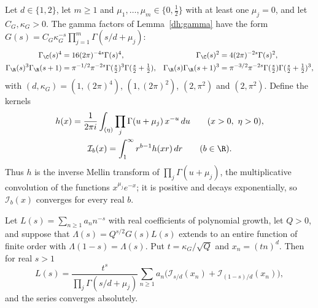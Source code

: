 Let $d\in\{1,2\}$, let $m\ge1$ and $\mu_1,\dots,\mu_m\in\{0,\frac12\}$ with at
least one $\mu_j=0$, and let $C_G,\kappa_G>0$. The gamma factors of
Lemma~\ref{dh:gamma} have the form
$G(s)=C_G\kappa_G^{-s}\prod_{j=1}^m\Gamma(s/d+\mu_j)$:
\[
 \begin{aligned}
 \Gamma_\C(s)^4&=16(2\pi)^{-4s}\Gamma(s)^4,&
 \Gamma_\C(s)^2&=4(2\pi)^{-2s}\Gamma(s)^2,\\
 \Gamma_\R(s)^3\Gamma_\R(s+1)&=\pi^{-1/2}\pi^{-2s}\Gamma(\tfrac s2)^3\Gamma(\tfrac s2+\tfrac12),&
 \Gamma_\R(s)\Gamma_\R(s+1)^3&=\pi^{-3/2}\pi^{-2s}\Gamma(\tfrac s2)\Gamma(\tfrac s2+\tfrac12)^3,
 \end{aligned}
\]
with $(d,\kappa_G)=(1,(2\pi)^4)$, $(1,(2\pi)^2)$, $(2,\pi^2)$ and $(2,\pi^2)$.
Define the kernels
\begin{gather*}
 h(x)=\frac1{2\pi i}\int_{(\eta)}\prod_j\Gamma(u+\mu_j)\,x^{-u}\,du\qquad(x>0,\ \eta>0),\\
 \mathcal I_b(x)=\int_1^\infty r^{b-1}h(xr)\,dr\qquad(b\in\R).
\end{gather*}
Thus $h$ is the inverse Mellin transform of $\prod_j\Gamma(u+\mu_j)$, the
multiplicative convolution of the functions $x^{\mu_j}e^{-x}$; it is positive
and decays exponentially, so $\mathcal I_b(x)$ converges for every real $b$.

\begin{lemma}\label{lv:afe}
Let $L(s)=\sum_{n\ge1}a_nn^{-s}$ with real coefficients of polynomial growth,
let $Q>0$, and suppose that $\Lambda(s)=Q^{s/2}G(s)L(s)$ extends to an
entire function of finite order with $\Lambda(1-s)=\Lambda(s)$. Put
$t=\kappa_G/\sqrt Q$ and $x_n=(tn)^d$. Then for real $s>1$
\[
 L(s)=\frac{t^s}{\prod_j\Gamma(s/d+\mu_j)}\sum_{n\ge1}a_n
 \bigl(\mathcal I_{s/d}(x_n)+\mathcal I_{(1-s)/d}(x_n)\bigr),
\]
and the series converges absolutely.
\end{lemma}

